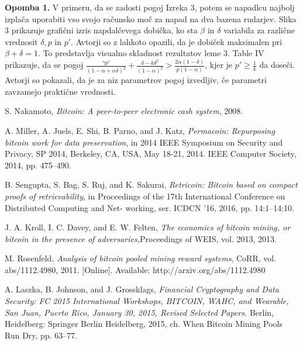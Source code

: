 \documentclass[12pt]{article}
\begin{document}
\textbf{Opomba 1.} V primeru, da se zadosti pogoj Izreka 3, potem se napadlcu najbolj izplača uporabiti vso svojo računsko moč za napad na dva bazena rudarjev. Slika 3 prikazuje grafični izris napdalčevega dobička, ko sta $\beta$ in $\delta$ variabila za različne vrednosit $\delta, p $ in $p'$. Avtorji so z lahkoto opazili, da je dobiček maksimalen pri $\beta + \delta = 1$. To predstavlja visualno skladnost rezultatov leme 3.
\newline
\newline
Table IV prikazuje, da se pogoj $\frac{\gamma p'}{(1 - \alpha + \alpha\delta)^2} + \frac{\delta - k\delta^2}{(1 - \alpha)^2} > \frac{2\alpha(1 - \delta)}{p(1 - \alpha)}$, kjer je $p' \geq \frac{1}{k}$ da doseči. Avtorji so pokazali, da je za niz parametrov pogoj izvedljiv, če parametri zavzamejo praktične vrednosti. 
\newpage
\begin{thebibliography}{9}
 
 S. Nakamoto, 
 \textit{Bitcoin: A peer-to-peer electronic cash system}, 2008.
 
 A. Miller, A. Juels, E. Shi, B. Parno, and J. Katz, 
 \textit{Permacoin: Repurposing bitcoin work for data preservation}, in 2014 IEEE Symposium on Security and Privacy, SP 2014, Berkeley, CA, USA, May 18-21, 2014. IEEE Computer Society, 2014, pp. 475–490.
 
 B. Sengupta, S. Bag, S. Ruj, and K. Sakurai, 
 \textit{Retricoin: Bitcoin based on compact proofs of retrievability}, in Proceedings of the 17th International Conference on Distributed Computing and Net- working, ser. ICDCN ’16, 2016, pp. 14:1–14:10.
 
 J. A. Kroll, I. C. Davey, and E. W. Felten, 
 \textit{The economics of bitcoin mining, or bitcoin in the presence of adversaries,}Proceedings of WEIS, vol. 2013, 2013.
 
 M. Rosenfeld,
 \textit{Analysis of bitcoin pooled mining reward systems}, CoRR, vol. abs/1112.4980, 2011. [Online]. Available: http://arxiv.org/abs/1112.4980
 
 A. Laszka, B. Johnson, and J. Grossklags, 
 \textit{Financial Cryptography and Data Security: FC 2015 International Workshops, BITCOIN, WAHC, and Wearable, San Juan, Puerto Rico, January 30, 2015, Revised Selected Papers.} Berlin, Heidelberg: Springer Berlin Heidelberg, 2015, ch. When Bitcoin Mining Pools Run Dry, pp. 63–77.
 

\end{thebibliography}
\end{document}
